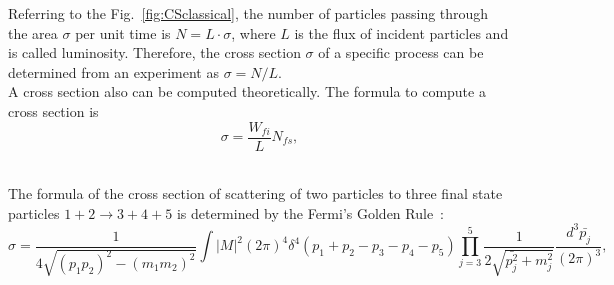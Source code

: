 Referring to the Fig.~\ref{fig:CSclassical}, the number of particles passing through the area $\sigma$ per unit time is $N=L \cdot \sigma$, where $L$ is the flux of incident particles and is called luminosity. Therefore, the cross section $\sigma$ of a specific process can be determined from an experiment as $\sigma=N/L$. \\

A cross section also can be computed theoretically. The formula to compute a cross section is\\

\begin{equation}
  \sigma = \frac{W_{fi}}{L} N_{fs},
\end{equation}

\\ 

The formula of the cross section of scattering of two particles to three final state particles $1+2\rightarrow 3+4+5$ is determined by the Fermi's Golden Rule~\cite{ref_Griffiths}: \\

\begin{equation}\label{eq:FermiGoldenRule}
  \sigma = \frac{ 1 }{4\sqrt{(p_1p_2)^2-(m_1m_2)^2}} \int |M|^2 (2\pi)^4 \delta^4(p_1+p_2-p_3-p_4-p_5) \prod_{j=3}^{5} \frac{1}{2 \sqrt{\bar{p_j^2}+m_j^2 }}\frac{d^3\bar{p_j}}{(2\pi)^3},  
\end{equation}

\\ 

